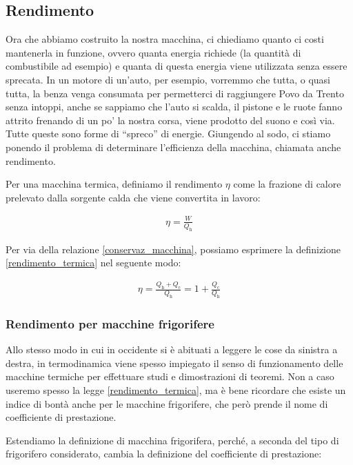\subsection{Rendimento}
Ora che abbiamo costruito la nostra macchina, ci chiediamo quanto ci
costi mantenerla in funzione, ovvero quanta energia richiede (la quantità
di combustibile ad esempio) e quanta di questa energia viene utilizzata
senza essere sprecata. In un motore di un'auto, per esempio, vorremmo che
tutta, o quasi tutta, la benza venga consumata per permetterci di raggiungere
Povo da Trento senza intoppi, anche se sappiamo che l'auto si scalda, il pistone
e le ruote fanno attrito frenando di un po' la nostra corsa, viene prodotto
del suono e così via. Tutte queste sono forme di ``spreco'' di energie.
Giungendo al sodo, ci stiamo ponendo il problema
di determinare l'efficienza della macchina, chiamata anche rendimento.

Per una macchina termica, definiamo il rendimento $\eta$ come
la frazione di calore prelevato dalla sorgente calda che
viene convertita in lavoro:

\begin{align}
    \eta = \frac{W}{Q_\text{h}}\label{rendimento_termica}
\end{align}

\noindent Per via della relazione \ref{conservaz_macchina},
possiamo esprimere la definizione \ref{rendimento_termica}
nel seguente modo:

\begin{align*}
    \eta = \frac{Q_\text{h} + Q_\text{c}}{Q_\text{h}} = 1 + \frac{Q_\text{c}}{Q_\text{h}}
\end{align*}


\subsubsection*{Rendimento per macchine frigorifere}
Allo stesso modo in cui in occidente si è abituati a leggere le cose
da sinistra a destra, in termodinamica viene spesso impiegato il senso di
funzionamento delle macchine termiche per effettuare studi e dimostrazioni
di teoremi. Non a caso useremo spesso la legge \ref{rendimento_termica},
ma è bene ricordare che esiste un indice di bontà anche per
le macchine frigorifere, che però prende il nome di coefficiente di
prestazione.

Estendiamo la definizione di macchina frigorifera, perché, a seconda del
tipo di frigorifero considerato, cambia la definizione del coefficiente
di prestazione:

